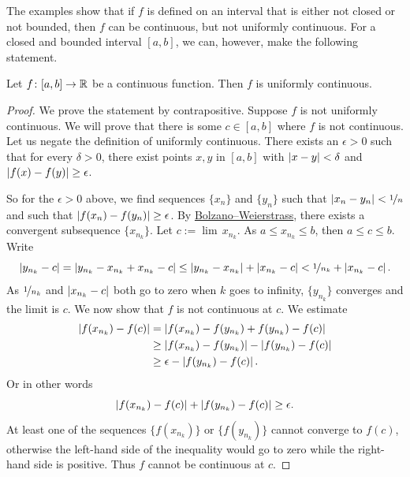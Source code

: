 The examples show that if $f$ is defined on an interval that is either not closed
or not bounded, then $f$ can be continuous, but not uniformly continuous.
For a closed and bounded interval $[a,b]$, we can, however,
make the following statement.

\begin{thm} \label{unifcont:thm}
Let $f \colon [a,b] \to {\mathbb{R}}$ be a continuous function.  Then $f$
is uniformly continuous.
\end{thm}

\begin{proof}
We prove the statement by contrapositive.
Suppose $f$ is not uniformly continuous.  We will prove
that there is some
$c \in [a,b]$ where $f$ is not continuous.  Let us negate
the definition of uniformly continuous.
There exists an $\epsilon > 0$
such that for every $\delta > 0$, there exist points $x, y$ in $[a,b]$ with
$\left\lvert {x-y} \right\rvert < \delta$ and $\left\lvert {f(x)-f(y)} \right\rvert \geq \epsilon$.

So for the $\epsilon > 0$ above,
we find sequences $\{ x_n \}$ and $\{ y_n \}$ such that
$\left\lvert {x_n-y_n} \right\rvert < \nicefrac{1}{n}$ and such that $\left\lvert {f(x_n)-f(y_n)} \right\rvert \geq
\epsilon$.  By
\hyperref[thm:bwseq]{Bolzano--Weierstrass},
there exists a convergent subsequence
$\{ x_{n_k} \}$.  Let $c := \lim\, x_{n_k}$.
As $a \leq x_{n_k} \leq b$, then $a \leq c \leq b$.  Write
\begin{equation*}
\left\lvert {y_{n_k} - c} \right\rvert =
\left\lvert {y_{n_k} - x_{n_k} + x_{n_k} - c} \right\rvert \leq
\left\lvert {y_{n_k} - x_{n_k}} \right\rvert
+
\left\lvert {x_{n_k}-c} \right\rvert
<
\nicefrac{1}{n_k} 
+
\left\lvert {x_{n_k}-c} \right\rvert .
\end{equation*}
As $\nicefrac{1}{n_k}$ and $\left\lvert {x_{n_k}-c} \right\rvert$ both go to zero when
$k$ goes to infinity, $\{ y_{n_k} \}$ converges and the limit
is $c$.  We now show that $f$ is not continuous at $c$.  We
estimate
\begin{equation*}
\begin{split}
\left\lvert {f(x_{n_k}) - f(c)} \right\rvert & =
\left\lvert {f(x_{n_k}) - f(y_{n_k}) + f(y_{n_k}) - f(c)} \right\rvert \\
& \geq
\left\lvert {f(x_{n_k}) - f(y_{n_k})} \right\rvert - \left\lvert {f(y_{n_k}) - f(c)} \right\rvert \\
& \geq
\epsilon - \left\lvert {f(y_{n_k})-f(c)} \right\rvert .
\end{split}
\end{equation*}
Or in other words
\begin{equation*}
\left\lvert {f(x_{n_k})-f(c)} \right\rvert 
+
\left\lvert {f(y_{n_k})-f(c)} \right\rvert  \geq
\epsilon .
\end{equation*}
At least one of the sequences $\{ f(x_{n_k}) \}$  or
$\{ f(y_{n_k}) \}$ cannot converge to $f(c)$, otherwise the
left-hand side of the inequality would go to zero while the right-hand side is positive.
Thus $f$ cannot be continuous at $c$.
\end{proof}

